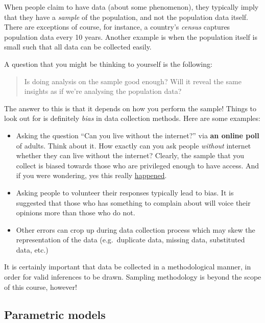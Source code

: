 \documentclass[
]{book}
\theoremstyle{definition}
\theoremstyle{definition}
\theoremstyle{definition}
\theoremstyle{definition}
\theoremstyle{remark}
\begin{document}
When people claim to have data (about some phenomenon), they typically imply that they have a \emph{sample} of the population, and not the population data itself. There are exceptions of course, for instance, a country's \emph{census} captures population data every 10 years. Another example is when the population itself is small such that all data can be collected easily.

A question that you might be thinking to yourself is the following:

\begin{quote}
Is doing analysis on the sample good enough? Will it reveal the same insights as if we're analysing the population data?
\end{quote}

The answer to this is that it depends on how you perform the sample! Things to look out for is definitely \emph{bias} in data collection methods. Here are some examples:

\begin{itemize}
\item
  Asking the question ``Can you live without the internet?'' via \textbf{an online poll} of adults. Think about it. How exactly can you ask people \emph{without} internet whether they can live without the internet? Clearly, the sample that you collect is biased towards those who are privileged enough to have access. And if you were wondering, yes this really \href{https://www.forbes.com/sites/niallmccarthy/2017/08/29/where-people-cant-live-without-the-internet-infographic/?sh=430d133643aa}{happened}.
\item
  Asking people to volunteer their responses typically lead to bias. It is suggested that those who has something to complain about will voice their opinions more than those who do not.
\item
  Other errors can crop up during data collection process which may skew the representation of the data (e.g.~duplicate data, missing data, substituted data, etc.)
\end{itemize}

It is certainly important that data be collected in a methodological manner, in order for valid inferences to be drawn.
Sampling methodology is beyond the scope of this course, however!

\hypertarget{parametric-models}{%
\subsection*{Parametric models}\label{parametric-models}}
\end{document}
